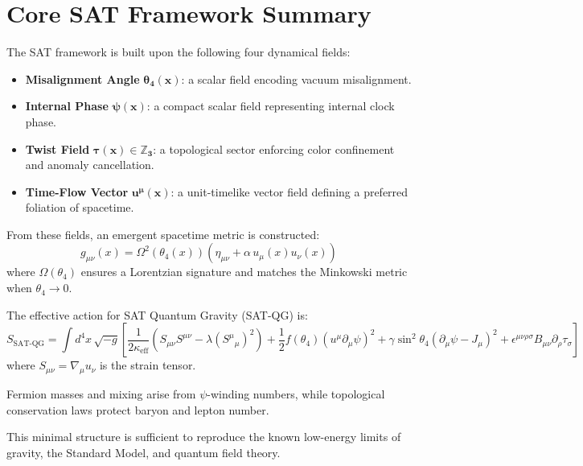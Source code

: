 \documentclass[12pt]{article}
\begin{document}
\section{Core SAT Framework Summary}

The SAT framework is built upon the following four dynamical fields:
\begin{itemize}
    \item \textbf{Misalignment Angle} $\bm{\theta_4(x)}$: a scalar field encoding vacuum misalignment.
    \item \textbf{Internal Phase} $\bm{\psi(x)}$: a compact scalar field representing internal clock phase.
    \item \textbf{Twist Field} $\bm{\tau(x) \in \mathbb{Z}_3}$: a topological sector enforcing color confinement and anomaly cancellation.
    \item \textbf{Time-Flow Vector} $\bm{u^\mu(x)}$: a unit-timelike vector field defining a preferred foliation of spacetime.
\end{itemize}

From these fields, an emergent spacetime metric is constructed:
\begin{equation}
g_{\mu\nu}(x) = \Omega^2(\theta_4(x)) \left( \eta_{\mu\nu} + \alpha \, u_\mu(x) u_\nu(x) \right)
\end{equation}
where $\Omega(\theta_4)$ ensures a Lorentzian signature and matches the Minkowski metric when $\theta_4 \to 0$.

The effective action for SAT Quantum Gravity (SAT-QG) is:
\begin{equation}
S_{\text{SAT-QG}} = \int d^4x \, \sqrt{-g} \left[
\frac{1}{2\kappa_{\text{eff}}} \left( S_{\mu\nu} S^{\mu\nu} - \lambda (S^\mu{}_\mu)^2 \right)
+ \frac{1}{2} f(\theta_4) (u^\mu \partial_\mu \psi)^2
+ \gamma \sin^2\theta_4 (\partial_\mu \psi - J_\mu)^2
+ \epsilon^{\mu\nu\rho\sigma} B_{\mu\nu} \partial_\rho \tau_\sigma
\right]
\end{equation}
where $S_{\mu\nu} = \nabla_\mu u_\nu$ is the strain tensor.

Fermion masses and mixing arise from $\psi$-winding numbers, while topological conservation laws protect baryon and lepton number.

This minimal structure is sufficient to reproduce the known low-energy limits of gravity, the Standard Model, and quantum field theory.

\end{document}
